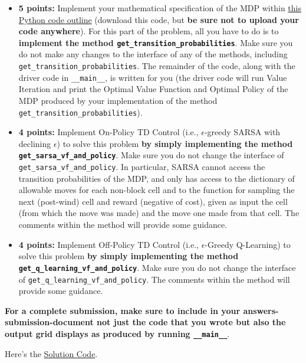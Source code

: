 \documentclass[12pt]{exam}
\begin{document}
\begin{questions}
\begin{itemize}
\begin{solution}
\end{solution}
\item {\bf 5 points: } Implement your mathematical specification of the MDP within \href{https://github.com/TikhonJelvis/RL-book/tree/master/rl/problems/Final-Winter2021/windy_grid_outline.py}{this Python code outline} (download this code, but {\bf be sure not to upload your code anywhere}). For this part of the problem, all you have to do is to {\bf implement the method \lstinline{get_transition_probabilities}}. Make sure you do not make any changes to the interface of any of the methods, including \lstinline{get_transition_probabilities}. The remainder of the code, along with the driver code in \lstinline{__main__}, is written for you (the driver code will run Value Iteration and print the Optimal Value Function and Optimal Policy of the MDP produced by your implementation of the method \lstinline{get_transition_probabilities}).
\item {\bf 4 points: } Implement On-Policy TD Control (i.e., $\epsilon$-greedy SARSA with declining $\epsilon$) to solve this problem {\bf by simply implementing the method \lstinline{get_sarsa_vf_and_policy}}. Make sure you do not change the interface of \lstinline{get_sarsa_vf_and_policy}. In particular, SARSA cannot access the transition probabilities of the MDP, and only has access to the dictionary of allowable moves for each non-block cell and to the function for sampling the next (post-wind) cell and reward (negative of cost), given as input the cell (from which the move was made) and the move one made from that cell. The comments within the method will provide some guidance.
\item {\bf 4 points: } Implement Off-Policy TD Control (i.e., $\epsilon$-Greedy Q-Learning) to solve this problem {\bf by simply implementing the method \lstinline{get_q_learning_vf_and_policy}}. Make sure you do not change the interface of \lstinline{get_q_learning_vf_and_policy}. The comments within the method will provide some guidance.
\end{itemize}

{\bf For a complete submission, make sure to include in your answers-submission-document not just the code that you wrote but also the output grid displays as produced by running \lstinline{__main__}}.

\begin{solution}

Here's the 
\href{https://github.com/TikhonJelvis/RL-book/tree/master/rl/problems/Final-Winter2021/windy_grid.py}{Solution Code}.


\end{solution}
\end{questions}
\end{document}
